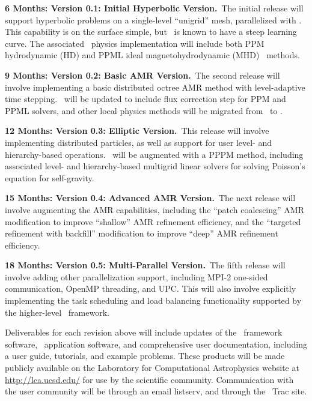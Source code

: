 \documentclass[11pt,letterpaper]{article}
\begin{document}
\textbf{6 Months: Version 0.1: Initial Hyperbolic Version.}~The
initial release will support hyperbolic problems on a single-level
``unigrid'' mesh, parallelized with \charm.  This capability is on the
surface simple, but \charm\ is known to have a steep learning curve.
The associated \enzoii\ physics implementation will include both PPM
hydrodynamic (HD) and PPML ideal magnetohydrodynamic
(MHD)~\cite{UsPo09} methods.

\textbf{9 Months: Version 0.2: Basic AMR Version.}~The second release will involve
implementing a basic distributed octree AMR method with level-adaptive
time stepping.  \enzoii\ will be updated to include flux correction
step for PPM and PPML solvers, and other local physics methods will be
migrated from \enzo\ to \enzoii.

\textbf{12 Months: Version 0.3: Elliptic Version.}~This release will involve
implementing distributed particles, as well as support for user level-
and hierarchy-based operations.  \enzoii\ will be augmented with a
PPPM method, including associated level- and hierarchy-based multigrid
linear solvers for solving Poisson's equation for self-gravity.

\textbf{15 Months: Version 0.4: Advanced AMR Version.}~The next release will
involve augmenting the AMR capabilities, including the ``patch
coalescing'' AMR modification to improve ``shallow'' AMR refinement
efficiency, and the ``targeted refinement with backfill'' modification
to improve ``deep'' AMR refinement efficiency.

\textbf{18 Months: Version 0.5: Multi-Parallel Version.}~The fifth
release will involve adding other parallelization support, including
MPI-2 one-sided communication, OpenMP threading, and UPC.  This will
also involve explicitly implementing the task scheduling and load
balancing functionality supported by the higher-level \charm\
framework.

Deliverables for each revision above will include updates of the
\cello\ framework software, \enzoii\ application software, and
comprehensive user documentation, including a user guide, tutorials,
and example problems.  These products will be made publicly available
on the Laboratory for Computational Astrophysics website at
\url{http://lca.ucsd.edu/} for use by the scientific community.
Communication with the user community will be through an email
listserv, and through the \cello\ Trac site.  
\end{document}
